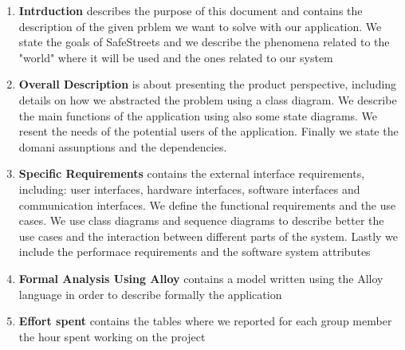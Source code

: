 \begin{enumerate}
  \item \textbf{Intrduction} describes the purpose of this document and contains the description of the given prblem we want to solve with our application. We state the goals of SafeStreets and we describe the phenomena related to the "world" where it will be used and the ones related to our system
  \item \textbf{Overall Description} is about presenting the product perspective, including details on how we abstracted the problem using a class diagram. We describe the main functions of the application using also some state diagrams. We resent the needs of the potential users of the application. Finally we state the domani assunptions and the dependencies.
  \item \textbf{Specific Requirements} contains the external interface requirements, including: user interfaces, hardware interfaces, software interfaces and communication interfaces. We define the functional requirements and the use cases. We use class diagrams and sequence diagrams to describe better the use cases and the interaction between different parts of the system.  Lastly we include the performace requirements and the software system attributes
  \item \textbf{Formal Analysis Using Alloy} contains a model written using the Alloy language in order to describe formally the application
  \item \textbf{Effort spent} contains the tables where we reported for each group member the hour spent working on the project
\end{enumerate}
